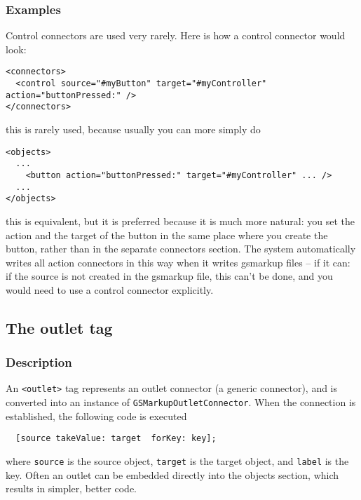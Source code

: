 \subsubsection{Examples}
Control connectors are used very rarely.  Here is how a control
connector would look:
\begin{verbatim}
<connectors>
  <control source="#myButton" target="#myController" action="buttonPressed:" />
</connectors>
\end{verbatim}
this is rarely used, because usually you can more simply do
\begin{verbatim}
<objects>
  ...
    <button action="buttonPressed:" target="#myController" ... />
  ...
</objects>
\end{verbatim}
this is equivalent, but it is preferred because it is much more
natural: you set the action and the target of the button in the same
place where you create the button, rather than in the separate
connectors section.  The system automatically writes all action
connectors in this way when it writes gsmarkup files -- if it can: if the
source is not created in the gsmarkup file, this can't be done, and you
would need to use a control connector explicitly.

\subsection{The outlet tag}

\subsubsection{Description}
An \texttt{<outlet>} tag represents an outlet connector (a generic
connector), and is converted into an instance of
\texttt{GSMarkupOutletConnector}.  When the connection is established,
the following code is executed
\begin{verbatim}
  [source takeValue: target  forKey: key];
\end{verbatim}
where \texttt{source} is the source object, \texttt{target} is the
target object, and \texttt{label} is the key.  Often an outlet can be
embedded directly into the objects section, which results in simpler,
better code.

